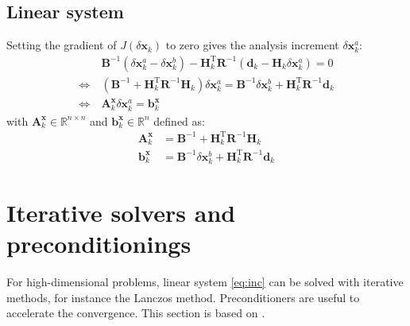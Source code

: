 \documentclass[12pt]{scrartcl}
\begin{document}
\subsection{Linear system}
Setting the gradient of $J(\delta \mathbf{x}_k)$ to zero gives the analysis increment $\delta \mathbf{x}^a_k$:
\begin{align}
\label{eq:inc}
& \ \mathbf{B}^{-1} \left(\delta \mathbf{x}^a_k - \delta \mathbf{x}^b_k\right) - \mathbf{H}_k^\mathrm{T} \mathbf{R}^{-1} \left(\mathbf{d}_k - \mathbf{H}_k \delta \mathbf{x}^a_k\right) = 0 \nonumber \\
\Leftrightarrow & \ \left(\mathbf{B}^{-1} + \mathbf{H}_k^\mathrm{T} \mathbf{R}^{-1} \mathbf{H}_k\right) \delta \mathbf{x}^a_k = \mathbf{B}^{-1} \delta \mathbf{x}^b_k + \mathbf{H}_k^\mathrm{T} \mathbf{R}^{-1} \mathbf{d}_k \nonumber \\
\Leftrightarrow & \ \boxed{\mathbf{A}^\mathbf{x}_k \delta \mathbf{x}^a_k = \mathbf{b}^\mathbf{x}_k}
\end{align}
with $\mathbf{A}^\mathbf{x}_k \in \mathbb{R}^{n \times n}$ and $\mathbf{b}^\mathbf{x}_k \in \mathbb{R}^{n}$ defined as:
\begin{align}
\mathbf{A}^\mathbf{x}_k & = \mathbf{B}^{-1} + \mathbf{H}_k^\mathrm{T} \mathbf{R}^{-1} \mathbf{H}_k \\
\mathbf{b}^\mathbf{x}_k & = \mathbf{B}^{-1} \delta \mathbf{x}^b_k + \mathbf{H}_k^\mathrm{T} \mathbf{R}^{-1} \mathbf{d}_k
\end{align}

\section{Iterative solvers and preconditionings}
For high-dimensional problems, linear system \eqref{eq:inc} can be solved with iterative methods, for instance the Lanczos method. Preconditioners are useful to accelerate the convergence. This section is based on \citet{gurol_phd_2013}.
\end{document}
